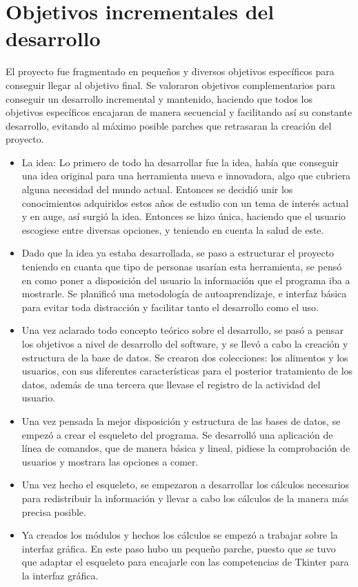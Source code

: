 \section{Objetivos incrementales del desarrollo}
El proyecto fue fragmentado en pequeños y diversos objetivos específicos para conseguir llegar al objetivo final. Se valoraron objetivos complementarios para conseguir un desarrollo incremental y mantenido, haciendo que todos los objetivos específicos encajaran de manera secuencial y facilitando así su constante desarrollo, evitando al máximo posible parches que retrasaran la creación del proyecto.
\begin{itemize}
\item La idea: Lo primero de todo ha desarrollar fue la idea, había que conseguir una idea original para una herramienta nueva e innovadora, algo que cubriera alguna necesidad del mundo actual. Entonces se decidió unir los conocimientos adquiridos estos años de estudio con un tema de interés actual y en auge, así surgió la idea. Entonces se hizo única, haciendo que el usuario escogiese entre diversas opciones, y teniendo en cuenta la salud de este.
\item Dado que la idea ya estaba desarrollada, se paso a estructurar el proyecto teniendo en cuanta que tipo de personas usarían esta herramienta, se pensó en como poner a disposición del usuario la información que el programa iba a mostrarle. Se planificó una metodología de autoaprendizaje, e interfaz básica para evitar toda distracción y facilitar tanto el desarrollo como el uso.
\item Una vez aclarado todo concepto teórico sobre el desarrollo, se pasó a pensar los objetivos a nivel de desarrollo del software, y se llevó a cabo la creación y estructura de la base de datos. Se crearon dos colecciones: los alimentos y los usuarios, con sus diferentes características para el posterior tratamiento de los datos, además de una tercera que llevase el registro de la actividad del usuario.
\item Una vez pensada la mejor disposición y estructura de las bases de datos, se empezó a crear el esqueleto del programa. Se desarrolló una aplicación de línea de comandos, que de manera básica y lineal, pidiese la comprobación de usuarios y mostrara las opciones a comer.
\item	Una vez hecho el esqueleto, se empezaron a desarrollar los cálculos necesarios para redistribuir la información y llevar a cabo los cálculos de la manera más precisa posible.
\item	Ya creados los módulos y hechos los cálculos se empezó a trabajar sobre la interfaz gráfica. En este paso hubo un pequeño parche, puesto que se tuvo que adaptar el esqueleto para encajarle con las competencias de Tkinter para la interfaz gráfica.

\end{itemize}
